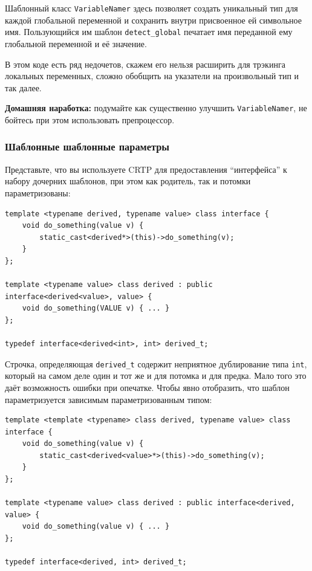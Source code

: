\documentclass[a4paper,12pt,oneside]{article}
\begin{document}
Шаблонный класс \lstinline!VariableNamer! здесь позволяет создать уникальный тип для каждой глобальной переменной и сохранить внутри присвоенное ей символьное имя. Пользующийся им шаблон \lstinline!detect_global! печатает имя переданной ему глобальной переменной и её значение.

В этом коде есть ряд недочетов, скажем его нельзя расширить для трэкинга локальных переменных, сложно обобщить на указатели на произвольный тип и так далее.

\textbf{Домашняя наработка:} подумайте как существенно улучшить \lstinline!VariableNamer!, не бойтесь при этом использовать препроцессор.

\subsubsection{Шаблонные шаблонные параметры}\label{TemplateTemplateArguments}

Представьте, что вы используете CRTP для предоставления ``интерфейса'' к набору дочерних шаблонов, при этом как родитель, так и потомки параметризованы:

\begin{lstlisting}
template <typename derived, typename value> class interface {
    void do_something(value v) {
        static_cast<derived*>(this)->do_something(v);
    }
};

template <typename value> class derived : public interface<derived<value>, value> {
    void do_something(VALUE v) { ... }
};

typedef interface<derived<int>, int> derived_t;
\end{lstlisting}

Строчка, определяющая \lstinline!derived_t! содержит неприятное дублирование типа  \lstinline!int!, который на самом деле один и тот же и для потомка и для предка. Мало того это даёт возможность ошибки при опечатке. Чтобы явно отобразить, что шаблон параметризуется зависимым параметризованным типом:

\begin{lstlisting}
template <template <typename> class derived, typename value> class interface {
    void do_something(value v) {
        static_cast<derived<value>*>(this)->do_something(v);
    }
};

template <typename value> class derived : public interface<derived, value> {
    void do_something(value v) { ... }
};

typedef interface<derived, int> derived_t;
\end{lstlisting}
\end{document}
